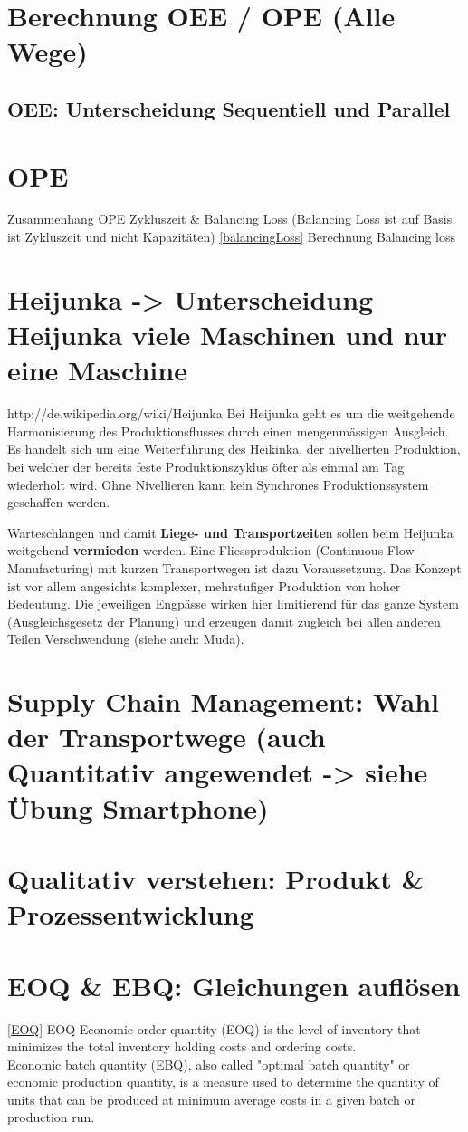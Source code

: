 \section{Berechnung OEE / OPE (Alle Wege)}
\subsection{OEE: Unterscheidung Sequentiell und Parallel}
\section{OPE}
Zusammenhang OPE Zykluszeit \& Balancing Loss (Balancing Loss ist auf Basis ist Zykluszeit und nicht Kapazit\"aten)
\ref{balancingLoss} Berechnung Balancing loss
\section{Heijunka -> Unterscheidung Heijunka viele Maschinen und nur eine Maschine}
http://de.wikipedia.org/wiki/Heijunka
Bei Heijunka geht es um die weitgehende Harmonisierung des Produktionsflusses durch einen mengenm\"assigen Ausgleich. Es handelt sich um eine Weiterf\"uhrung des Heikinka, der nivellierten Produktion, bei welcher der bereits feste Produktionszyklus \"ofter als einmal am Tag wiederholt wird. Ohne Nivellieren kann kein Synchrones Produktionssystem geschaffen werden.

Warteschlangen und damit \textbf{Liege- und Transportzeite}n sollen beim Heijunka weitgehend \textbf{vermieden} werden. Eine Fliessproduktion (Continuous-Flow-Manufacturing) mit kurzen Transportwegen ist dazu Voraussetzung. Das Konzept ist vor allem angesichts komplexer, mehrstufiger Produktion von hoher Bedeutung. Die jeweiligen Engp\"asse wirken hier limitierend f\"ur das ganze System (Ausgleichsgesetz der Planung) und erzeugen damit zugleich bei allen anderen Teilen Verschwendung (siehe auch: Muda).
\section{Supply Chain Management: Wahl der Transportwege (auch Quantitativ angewendet -> siehe \"Ubung Smartphone)}
\section{Qualitativ verstehen: Produkt \& Prozessentwicklung}
\section{EOQ \& EBQ: Gleichungen aufl\"osen}
\ref{EOQ} EOQ
Economic order quantity (EOQ) is the level of inventory that minimizes the total inventory holding costs and ordering costs.\\
	Economic batch quantity (EBQ), also called "optimal batch quantity" or economic production quantity, is a measure used to determine the quantity of units that can be produced at minimum average costs in a given batch or production run.
